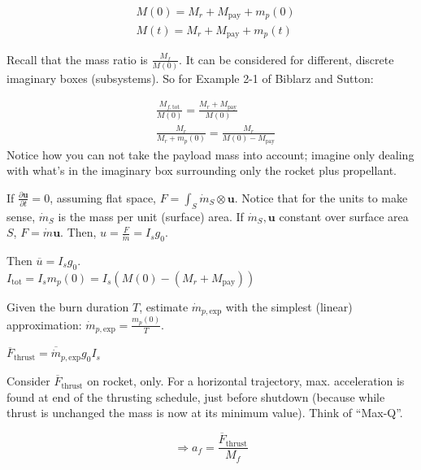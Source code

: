 \[
\begin{aligned}
& M(0) = M_r + M_{\text{pay}} + m_p(0) \\
& M(t) = M_r + M_{\text{pay}} + m_p(t)
\end{aligned}
\]

Recall that the mass ratio is $\frac{M_f}{M(0)}$. It can be
considered for different, discrete
imaginary boxes (subsystems). So for Example 2-1 of Biblarz and Sutton:

\[
\begin{aligned}
&	\frac{M_{f, \text{tot}}}{M(0)}
 = \frac{M_r + M_{\text{pay}}}{ M(0) } \\
	& \frac{ M_r }{ M_r+ m_p(0)}
 = \frac{M_r }{ M(0) - M_{\text{pay}}}
\end{aligned}
\]
Notice how you can not take the payload mass into account; imagine only
dealing with what's in the imaginary box surrounding only the rocket plus
propellant.

If $\frac{\partial \mathbf{u}}{ \partial t} = 0$, assuming flat space,
$F = \int_S \dot{m}_S \otimes \mathbf{u}$. Notice that for the units to make
sense, $\dot{m}_S$ is the mass per unit (surface) area. If
$\dot{m}_S , \mathbf{u}$ constant over surface area $S$,
$F= \dot{m} \mathbf{u}$.  Then, $u = \frac{F}{\dot{m}} = I_s g_0$.

Then $\overline{u} = I_s g_0$. \\
$I_{\text{tot}} = I_s m_p(0) = I_s(M(0) - (M_r + M_{\text{pay}}))$

Given the burn duration $T$, estimate $\dot{m}_{p, \text{exp}}$ with the
simplest (linear) approximation:
$\dot{m}_{p, \text{exp}} = \frac{m_p(0)}{T}$.

$\overline{F}_{\text{thrust}} = \overline{ \dot{m}}_{p, \text{exp}} g_0 I_s$

Consider $\overline{F}_{\text{thrust}}$ on rocket, only. For a horizontal
trajectory, max. acceleration is found at end of the thrusting schedule, just
before shutdown (because while thrust is unchanged the mass is now at its
minimum value). Think of ``Max-Q''.

\[
\Longrightarrow a_f = \frac{ \overline{F}_{\text{thrust}} }{ M_f}
\]

